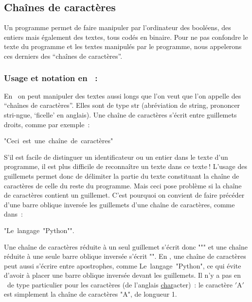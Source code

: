 \subsection{Chaînes de caractères}

Un programme permet de faire manipuler par l'ordinateur des booléens, des entiers mais
également des textes, tous codés en binaire. Pour ne pas confondre le texte du programme
et les textes manipulés par le programme, nous appelerons ces derniers des ``chaînes de
caractères''.

\subsubsection{Usage et notation en \protect\python~:}
En \python\ on peut manipuler des textes aussi longs que l'on veut que l'on appelle des
``chaînes de caractères''. Elles sont de type {\idt str} (abréviation de {\idt string}, prononcer stri-ngue, `ficelle'
en anglais). Une chaîne de caractères s'écrit entre guillemets droits, comme par exemple~:
\begin{center}
{\cha "Ceci\ est\ une\ chaîne\ de\ caractères"}
\end{center}
S'il est facile de distinguer un identificateur ou un entier dans le texte d'un
programme, il est plus difficile de reconnaître un texte dans ce texte$\:$! L'usage des guillemets permet donc de
délimiter la partie du texte constituant la chaîne de caractères de celle du reste du programme. Mais ceci pose
problème si la chaîne de caractères contient un guillemet. C'est pourquoi on convient de faire précéder
d'une barre oblique inversée {\cha {}} les guillemets d'une chaîne de caractères,
comme dans~:
\begin{center}
{\cha "Le\ langage\ "Python""}.
\end{center}
Une chaîne de caractères réduite à un seul guillemet s'écrit donc
{\cha """} et une chaîne réduite à une seule barre oblique inversée s'écrit
{\cha ""}. En \python, une chaîne de caractères peut aussi s'écrire entre
apostrophes, comme {\cha \textquotesingle{}Le\ langage\ "Python"\textquotesingle{}}, ce qui évite
d'avoir à placer une barre oblique inversée devant les guillemets. Il n'y a pas en \python\ de type
particulier pour les caractères (de l'anglais \underline{char}acter)~: le caractère
{\cha $\scriptstyle '$A$\scriptstyle '$} est simplement la chaîne de caractères {\cha "A"}, de longueur 1.

